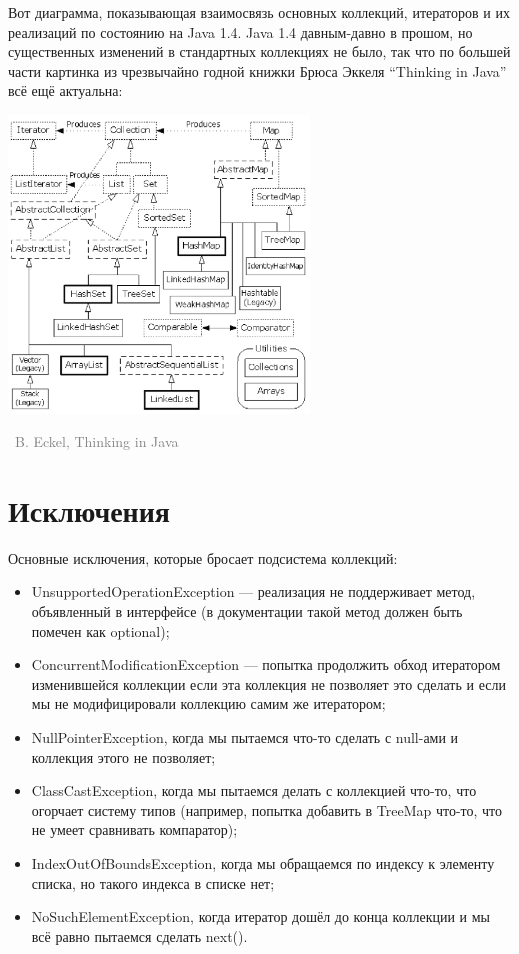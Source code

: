 \documentclass[a5paper]{article}
\newcommand{\attribution}[1] {
\vspace{-5mm}\begin{flushright}\begin{scriptsize}\textcolor{gray}{\textcopyright\, #1}\end{scriptsize}\end{flushright}
}
\begin{document}
Вот диаграмма, показывающая взаимосвязь основных коллекций, итераторов и их реализаций по состоянию на Java 1.4. Java 1.4 давным-давно в прошом, но существенных изменений в стандартных коллекциях не было, так что по большей части картинка из чрезвычайно годной книжки Брюса Эккеля ``Thinking in Java'' всё ещё актуальна:

\begin{center}
	\includegraphics[width=0.6\textwidth]{java4Containers.png}
	\attribution{B. Eckel, Thinking in Java}
\end{center}

\section{Исключения}

Основные исключения, которые бросает подсистема коллекций:

\begin{itemize}
	\item UnsupportedOperationException --- реализация не поддерживает метод, объявленный в интерфейсе (в документации такой метод должен быть помечен как optional);
	\item ConcurrentModificationException --- попытка продолжить обход итератором изменившейся коллекции если эта коллекция не позволяет это сделать и если мы не модифицировали коллекцию самим же итератором;
	\item NullPointerException, когда мы пытаемся что-то сделать с null-ами и коллекция этого не позволяет;
	\item ClassCastException, когда мы пытаемся делать с коллекцией что-то, что огорчает систему типов (например, попытка добавить в TreeMap что-то, что не умеет сравнивать компаратор);
	\item IndexOutOfBoundsException, когда мы обращаемся по индексу к элементу списка, но такого индекса в списке нет;
	\item NoSuchElementException, когда итератор дошёл до конца коллекции и мы всё равно пытаемся сделать next().
\end{itemize}
\end{document}
